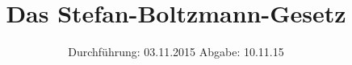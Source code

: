 


\subject{Versuch 207}
\title{Das Stefan-Boltzmann-Gesetz}
\date{
  Durchführung: 03.11.2015
  \hspace{3em}
  Abgabe: 10.11.15
}




\maketitle
\thispagestyle{empty}
\tableofcontents
\newpage






\printbibliography


